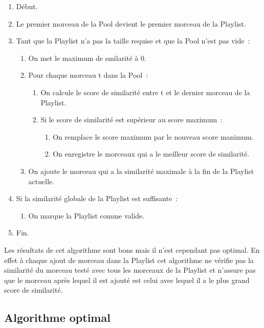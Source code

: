 \begin{enumerate}
\item Début.
\item Le premier morceau de la Pool devient le premier morceau de la Playlist.
\item Tant que la Playlist n'a pas la taille requise et que la Pool n'est pas vide~:
  \begin{enumerate}
    \item On met le maximum de smilarité à 0.
    \item Pour chaque morceau t dans la Pool~:
      \begin{enumerate}
        \item On calcule le score de similarité entre t et le dernier morceau de la Playlist.
    \item Si le score de similarité est supérieur au score maximum~:
        \begin{enumerate}
        \item On remplace le score maximum par le nouveau score manimum.
        \item On enregistre le morceaux qui a le meilleur score de similarité.
        \end{enumerate}
        \end{enumerate}
        \item On ajoute le morceau qui a la similarité maximale à la fin de la Playlist actuelle.
    \end{enumerate}
    \item Si la similarité globale de la Playlist est suffisante~:
    \begin{enumerate}
    \item On marque la Playlist comme valide.
    \end{enumerate}
    \item Fin.
\end{enumerate}

Les résultats de cet algorithme sont bons mais il n'est cependant pas optimal. En effet à chaque ajout de morceau dans la Playlist cet algorithme ne vérifie pas la similarité du morceau testé avec tous les morceaux de la Playlist et n'assure pas que le morceau après lequel il est ajouté est celui avec lequel il a le plus grand score de similarité.


\subsection{Algorithme optimal}
\label{impl:selection:optimal}

